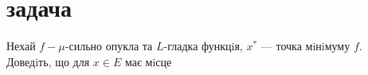 \section{задача}

\begin{tcolorbox}[title=Умова]
    Нехай $f - \mu$-сильно опукла та $L$-гладка функцiя, $x^*$ — точка мiнiмуму $f$. Доведiть, що для $x \in E$ має мiсце
\end{tcolorbox}

